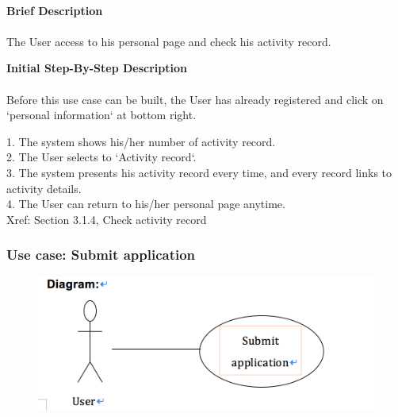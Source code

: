 \documentclass[12pt]{report}
\begin{document}
\paragraph{}
\begin{flushleft}
\textbf{Brief Description }
\paragraph{}
The User access to his personal page and check his activity record. \\

\begin{flushleft}
\textbf{Initial Step-By-Step Description }
\paragraph{}
Before this use case can be built, the User has already registered and click on `personal information` at bottom right.

\begin{flushleft}
1.	The system shows his/her number of activity record. \\
2.	The User selects to `Activity record`. \\
3.	The system presents his activity record every time, and every record links to activity details. \\
4.	The User can return to his/her personal page anytime. \\
Xref: Section 3.1.4, Check activity record
\end{flushleft}
\end{flushleft}
\end{flushleft}



\newpage
\subsubsection{Use case:  Submit application }

\begin{figure}[!htb]
  \includegraphics{5.PNG}
\end{figure}
\end{document}
